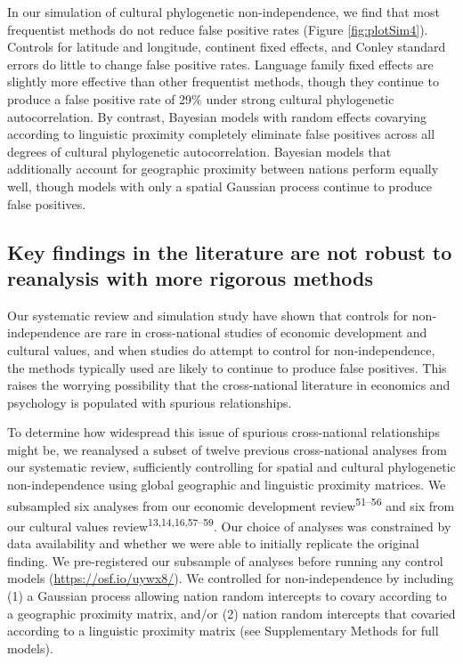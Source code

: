 \documentclass[english,man,floatsintext]{apa6}
\begin{document}
In our simulation of cultural phylogenetic non-independence, we find that most frequentist methods do not reduce false positive rates (Figure \ref{fig:plotSim4}). Controls for latitude and longitude, continent fixed effects, and Conley standard errors do little to change false positive rates. Language family fixed effects are slightly more effective than other frequentist methods, though they continue to produce a false positive rate of 29\% under strong cultural phylogenetic autocorrelation. By contrast, Bayesian models with random effects covarying according to linguistic proximity completely eliminate false positives across all degrees of cultural phylogenetic autocorrelation. Bayesian models that additionally account for geographic proximity between nations perform equally well, though models with only a spatial Gaussian process continue to produce false positives.

\hypertarget{key-findings-in-the-literature-are-not-robust-to-reanalysis-with-more-rigorous-methods}{%
\subsection{Key findings in the literature are not robust to reanalysis with more rigorous methods}\label{key-findings-in-the-literature-are-not-robust-to-reanalysis-with-more-rigorous-methods}}

Our systematic review and simulation study have shown that controls for non-independence are rare in cross-national studies of economic development and cultural values, and when studies do attempt to control for non-independence, the methods typically used are likely to continue to produce false positives. This raises the worrying possibility that the cross-national literature in economics and psychology is populated with spurious relationships.

To determine how widespread this issue of spurious cross-national relationships might be, we reanalysed a subset of twelve previous cross-national analyses from our systematic review, sufficiently controlling for spatial and cultural phylogenetic non-independence using global geographic and linguistic proximity matrices. We subsampled six analyses from our economic development review\textsuperscript{51--56} and six from our cultural values review\textsuperscript{13,14,16,57--59}. Our choice of analyses was constrained by data availability and whether we were able to initially replicate the original finding. We pre-registered our subsample of analyses before running any control models (\url{https://osf.io/uywx8/}). We controlled for non-independence by including (1) a Gaussian process allowing nation random intercepts to covary according to a geographic proximity matrix, and/or (2) nation random intercepts that covaried according to a linguistic proximity matrix (see Supplementary Methods for full models).
\end{document}
